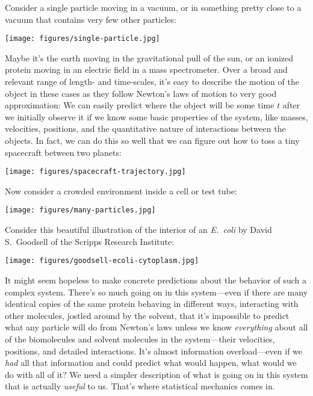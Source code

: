 \documentclass[english,course]{lecture}
\begin{document}
Consider a single particle moving in a vacuum, or in something pretty close to a vacuum that contains very few other particles:

\begin{centering}
\texttt{[image: figures/single-particle.jpg]}

\end{centering}

Maybe it's the earth moving in the gravitational pull of the sun, or an ionized protein moving in an electric field in a mass spectrometer.
Over a broad and relevant range of length- and time-scales, it's easy to describe the motion of the object in these cases as they follow Newton's laws of motion to very good approximation: We can easily predict where the object will be some time $t$ after we initially observe it if we know some basic properties of the system, like masses, velocities, positions, and the quantitative nature of interactions between the objects.
In fact, we can do this so well that we can figure out how to toss a tiny spacecraft between two planets:

\begin{centering}
\texttt{[image: figures/spacecraft-trajectory.jpg]}

\end{centering}

Now consider a crowded environment inside a cell or test tube:

\begin{centering}
\texttt{[image: figures/many-particles.jpg]}

\end{centering}

Consider this beautiful illustration of the interior of an \emph{E.~coli} by David S.\ Goodsell of the Scripps Research Institute:

\begin{centering}
\texttt{[image: figures/goodsell-ecoli-cytoplasm.jpg]}

\end{centering}

It might seem hopeless to make concrete predictions about the behavior of such a complex system.
There's so much going on in this system---even if there are many identical copies of the same protein behaving in different ways, interacting with other molecules, jostled around by the solvent, that it's impossible to predict what any particle will do from Newton's laws unless we know \emph{everything} about all of the biomolecules and solvent molecules in the system---their velocities, positions, and detailed interactions.
It's almost information overload---even if we \emph{had} all that information and could predict what would happen, what would we do with all of it?
We need a simpler description of what is going on in this system that is actually \emph{useful} to us.
That's where statistical mechanics comes in.
\end{document}
